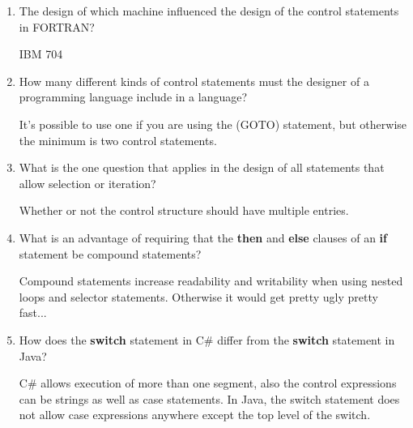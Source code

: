\begin{enumerate}
  \item The design of which machine influenced the design
    of the control statements in FORTRAN?
    
\begin{answer}

    IBM 704
    
\end{answer}

  \item How many different kinds of control statements
    must the designer of a programming language include
    in a language?

\begin{answer}

    It's possible to use one if you are using the (GOTO) statement, but otherwise the minimum is two control statements. 
    
\end{answer}

  \item What is the one question that applies in the
    design of all statements that allow selection or
    iteration?

\begin{answer}

    Whether or not the control structure should have multiple entries.
    
\end{answer}

  \item What is an advantage of requiring that
    the \textbf{then} and \textbf{else} clauses of
    an \textbf{if} statement be compound statements?
    
\begin{answer}

    Compound statements increase readability and writability when using nested loops and selector statements. Otherwise it would get pretty ugly pretty fast...
    
\end{answer}

  \item How does the \textbf{switch} statement in C\#
    differ from the \textbf{switch} statement in Java?
    
    \begin{answer}
    
    C\# allows execution of more than one segment, also the control expressions can be strings as well as case statements. In Java, the switch statement does not allow case expressions anywhere except the top level of the switch.
    

\end{answer}
\end{enumerate}
